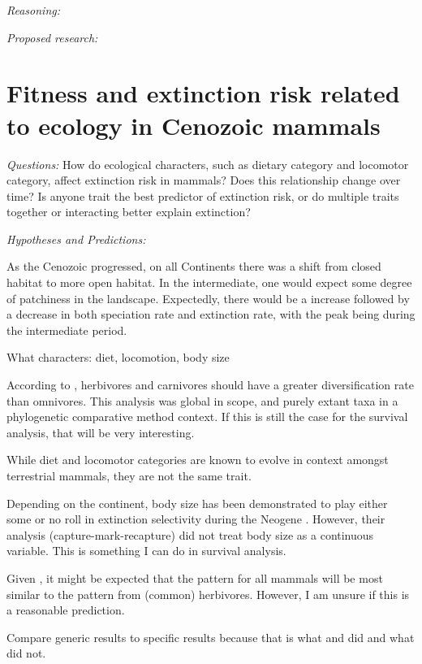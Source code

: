 \documentclass[12pt,letterpaper]{article}
\begin{document}
\textit{Reasoning:}

\textit{Proposed research:}


\section{Fitness and extinction risk related to ecology in Cenozoic mammals}

\textit{Questions:} How do ecological characters, such as dietary category and locomotor category, affect extinction risk in mammals? Does this relationship change over time? Is anyone trait the best predictor of extinction risk, or do multiple traits together or interacting better explain extinction?

\textit{Hypotheses and Predictions:} 

As the Cenozoic progressed, on all Continents there was a shift from closed habitat to more open habitat. In the intermediate, one would expect some degree of patchiness in the landscape. Expectedly, there would be a increase followed by a decrease in both speciation rate and extinction rate, with the peak being during the intermediate period.

What characters: diet, locomotion, body size

According to \citet{Price2012}, herbivores and carnivores should have a greater diversification rate than omnivores. This analysis was global in scope, and purely extant taxa in a phylogenetic comparative method context. If this is still the case for the survival analysis, that will be very interesting.

While diet and locomotor categories are known to evolve in context amongst terrestrial mammals, they are not the same trait.

Depending on the continent, body size has been demonstrated to play either some or no roll in extinction selectivity during the Neogene \citep{Tomiya2013,Liow2008,Liow2009}. However, their analysis (capture-mark-recapture) did not treat body size as a continuous variable. This is something I can do in survival analysis.

Given \citep{Jernvall2002}, it might be expected that the pattern for all mammals will be most similar to the pattern from (common) herbivores. However, I am unsure if this is a reasonable prediction.

Compare generic results to specific results because that is what \citet{Jernvall2002} and \citet{Jernvall2004} did and what \citet{Tomiya2013} did not.
\end{document}
